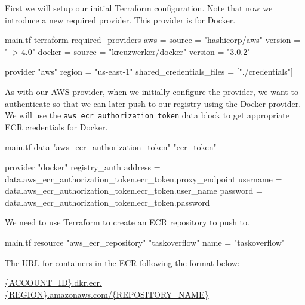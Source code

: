 \documentclass{csse4400}
\begin{document}

First we will setup our initial Terraform configuration.
Note that now we introduce a new required provider.
This provider is for Docker.

\begin{code}[language=terraform,numbers=none]{main.tf}
terraform {
   required_providers {
      aws = {
         source = "hashicorp/aws"
         version = "~> 4.0"
      }
      docker = {
         source  = "kreuzwerker/docker"
         version = "3.0.2"
      }
   }
}

provider "aws" {
   region = "us-east-1"
   shared_credentials_files = ["./credentials"]
}
\end{code}

As with our AWS provider,
when we initially configure the provider,
we want to authenticate so that we can later push to our registry using the Docker provider.
We will use the \texttt{aws\_ecr\_authorization\_token} data block to get appropriate ECR credentials for Docker.

\begin{code}[language=terraform,numbers=none]{main.tf}
data "aws_ecr_authorization_token" "ecr_token" {}

provider "docker" {
  registry_auth {
    address  = data.aws_ecr_authorization_token.ecr_token.proxy_endpoint
    username = data.aws_ecr_authorization_token.ecr_token.user_name
    password = data.aws_ecr_authorization_token.ecr_token.password
  }
}
\end{code}

We need to use Terraform to create an ECR repository to push to.

\begin{code}[language=terraform,numbers=none]{main.tf}
resource "aws_ecr_repository" "taskoverflow" {
  name = "taskoverflow"
}
\end{code}

The URL for containers in the ECR following the format below:

\url{{ACCOUNT_ID}.dkr.ecr.{REGION}.amazonaws.com/{REPOSITORY_NAME}}
\end{document}
